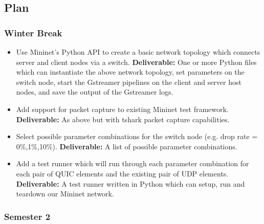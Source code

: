 \documentclass[11pt]{article}
\begin{document}
\subsection{Plan}\label{plan}

\subsubsection{Winter Break}

\begin{itemize}
  \item Use Mininet's Python API to create a basic network topology which connects server and client nodes via a switch. \textbf{Deliverable:}
  One or more Python files which can instantiate the above network topology, set parameters on the switch node, start the Gstreamer pipelines on the client and server host nodes, and save the output of the Gstreamer logs.
  \item Add support for packet capture to existing Mininet test framework. \textbf{Deliverable:}
  As above but with tshark packet capture capabilities.
  \item Select possible parameter combinations for the switch node (e.g. drop rate = 0\%,1\%,10\%). \textbf{Deliverable:} A list of possible parameter combinations.
  \item Add a test runner which will run through each parameter combination for each pair of QUIC elements and the existing pair of UDP elements. \textbf{Deliverable:} A test runner written in Python which can setup, run and teardown our Mininet network.
\end{itemize}

\subsubsection{Semester 2}
\end{document}
